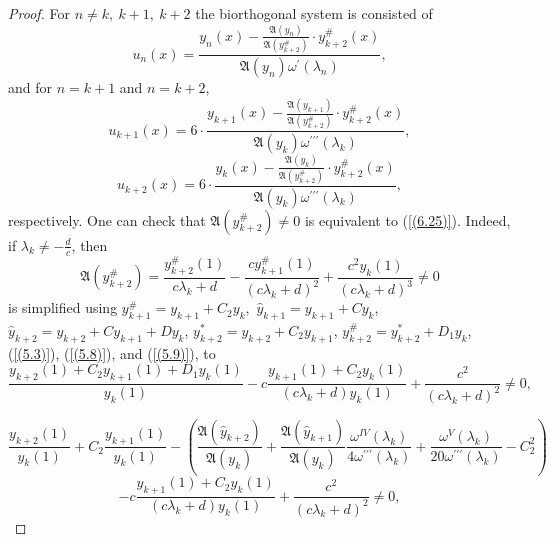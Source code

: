 \documentclass[10pt,a4paper]{amsart}
\numberwithin{equation}{section}
\begin{document}
\begin{proof} For $n \ne k,\ k+1,\ k+2$ the biorthogonal system is consisted of
\begin{equation}
u_n(x)=\frac{y_n(x)-\frac{\mathfrak{A}(y_{n})}{\mathfrak{A}(y_{k+2}^{\#})}\cdot y^{\#}_{k+2}(x)}{ \mathfrak{A}(y_{n})\omega^\prime(\lambda_n)}
, \label{(6.26)}
\end{equation}
and for $n = k+1$ and $n = k+2$,
\begin{equation}
u_{k+1}(x)=6\cdot\frac{y_{k+1}(x)-\frac{\mathfrak{A}(y_{k+1})}{\mathfrak{A}(y^{\#}_{k+2})}\cdot y^{\#}_{k+2}(x)}{ \mathfrak{A}(y_{k})\omega^{\prime\prime\prime}(\lambda_k)}
, \label{(6.27)}
\end{equation}
\begin{equation}
u_{k+2}(x)=6\cdot\frac{y_{k}(x)-\frac{\mathfrak{A}(y_{k})}{\mathfrak{A}(y^{\#}_{k+2})}\cdot y^{\#}_{k+2}(x)}{ \mathfrak{A}(y_{k})\omega^{\prime\prime\prime}(\lambda_k)}
, \label{(6.28)}
\end{equation}
respectively. One can check that $\mathfrak{A}(y_{k+2}^{\#})\neq 0$ is equivalent to (\ref{(6.25)}).
Indeed, if $\lambda_k\neq-\frac{d}{c}$, then
\begin{equation}
 \mathfrak{A}(y^{\#}_{k+2}) =
\frac{y^{\#}_{k + 2}(1)}{c\lambda_{k} + d} - \frac{cy^{\#}_{k+1}(1)}{\left( c\lambda_{k} + d \right)^{2}}
+\frac{c^2y_{k}(1)}{\left( c\lambda_{k} + d \right)^{3}}\neq0
 \label{(6.28.1.1)}
\end{equation}
is simplified using 
\(
y_{k+1}^\# = y_{k+1} + C_2 y_k,
\)
$\hat{y}_{k+1}={y}_{k+1}+Cy_k$,
$\hat{y}_{k+2}={y}_{k+2}+Cy_{k+1}+Dy_k$,
\(y^{*}_{k+2}=y_{k+2}+C_{2}y_{k+1}\),
$y^{\#}_{k+2}=y^{*}_{k+2}+D_{1}y_{k}$,
(\ref{(5.3)}), (\ref{(5.8)}), and (\ref{(5.9)}), to
$$
\frac{y_{k+2}(1) + C_2 y_{k+1}(1) + D_1 y_k(1)}{y_k(1)} - c\frac{y_{k+1}(1) + C_2 y_k(1)}{(c\lambda_k+d)y_k(1)} + \frac{c^2}{(c\lambda_k+d)^2} \neq 0,
$$

$$
\frac{y_{k+2}(1)}{y_k(1)} + C_2\frac{y_{k+1}(1)}{y_k(1)} - \left( \frac{\mathfrak{A}(\hat{y}_{k+2})}{\mathfrak{A}(y_k)} + \frac{\mathfrak{A}(\hat{y}_{k+1})}{\mathfrak{A}(y_k)}\frac{\omega^{IV}(\lambda_k)}{4\omega^{\prime\prime\prime}(\lambda_k)} + \frac{\omega^{V}(\lambda_k)}{20\omega^{\prime\prime\prime}(\lambda_k)} - C_2^2 \right)$$
$$- c\frac{y_{k+1}(1) + C_2 y_k(1)}{(c\lambda_k+d)y_k(1)} + \frac{c^2}{(c\lambda_k+d)^2} \neq 0,
$$


\end{proof}
\end{document}
